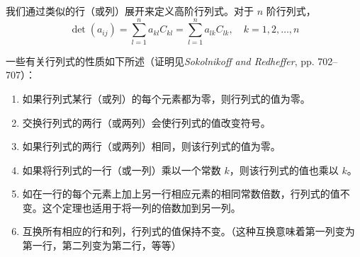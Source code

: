     我们通过类似的行（或列）展开来定义高阶行列式。对于 $n$ 阶行列式，
    \begin{equation}
        \det\left(a_{ij}\right) = \sum_{l=1}^{n} a_{kl}C_{kl} = \sum_{l=1}^{n} a_{lk}C_{lk}, \quad k = 1,2,\ldots,n
        \label{eq:8.29}
    \end{equation}

    一些有关行列式的性质如下所述（证明见\textit{Sokolnikoff and Redheffer}, pp. 702–707）：
        \begin{enumerate}
            \item 如果行列式某行（或列）的每个元素都为零，则行列式的值为零。
            \item 交换行列式的两行（或两列）会使行列式的值改变符号。
            \item 如果行列式的两行（或两列）相同，则该行列式的值为零。
            \item 如果将行列式的一行（或一列）乘以一个常数 $k$，则该行列式的值也乘以 $k$。
            \item 如在一行的每个元素上加上另一行相应元素的相同常数倍数，行列式的值不变。这个定理也适用于将一列的倍数加到另一列。
            \item 互换所有相应的行和列，行列式的值保持不变。（这种互换意味着第一列变为第一行，第二列变为第二行，等等）
        \end{enumerate}
    
